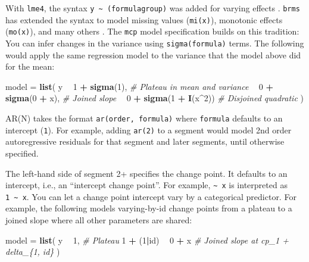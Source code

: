 \documentclass[
  american,
]{article}
\newenvironment{Shaded}{\begin{snugshade}}{\end{snugshade}}
\newcommand{\CommentTok}[1]{\textcolor[rgb]{0.56,0.35,0.01}{\textit{#1}}}
\newcommand{\DecValTok}[1]{\textcolor[rgb]{0.00,0.00,0.81}{#1}}
\newcommand{\KeywordTok}[1]{\textcolor[rgb]{0.13,0.29,0.53}{\textbf{#1}}}
\newcommand{\NormalTok}[1]{#1}
\newcommand{\OperatorTok}[1]{\textcolor[rgb]{0.81,0.36,0.00}{\textbf{#1}}}
\newcommand{\StringTok}[1]{\textcolor[rgb]{0.31,0.60,0.02}{#1}}
\begin{document}
With \texttt{lme4}, the syntax \texttt{y\ \textasciitilde{}\ (formula\textbar{}group)} was added for varying effects \citep{bates2015}. \texttt{brms} has extended the syntax to model missing values (\texttt{mi(x)}), monotonic effects (\texttt{mo(x)}), and many others \citep{burkner2017}. The \texttt{mcp} model specification builds on this tradition: You can infer changes in the variance using \texttt{sigma(formula)} terms. The following would apply the same regression model to the variance that the model above did for the mean:

\begin{Shaded}
\begin{Highlighting}[]
\NormalTok{model =}\StringTok{ }\KeywordTok{list}\NormalTok{(}
\NormalTok{  y }\OperatorTok{~}\StringTok{ }\DecValTok{1} \OperatorTok{+}\StringTok{ }\KeywordTok{sigma}\NormalTok{(}\DecValTok{1}\NormalTok{),         }\CommentTok{# Plateau in mean and variance}
    \OperatorTok{~}\StringTok{ }\DecValTok{0} \OperatorTok{+}\StringTok{ }\KeywordTok{sigma}\NormalTok{(}\DecValTok{0} \OperatorTok{+}\StringTok{ }\NormalTok{x),     }\CommentTok{# Joined slope}
    \OperatorTok{~}\StringTok{ }\DecValTok{0} \OperatorTok{+}\StringTok{ }\KeywordTok{sigma}\NormalTok{(}\DecValTok{1} \OperatorTok{+}\StringTok{ }\KeywordTok{I}\NormalTok{(x}\OperatorTok{^}\DecValTok{2}\NormalTok{)) }\CommentTok{# Disjoined quadratic}
\NormalTok{)}
\end{Highlighting}
\end{Shaded}

AR(N) takes the format \texttt{ar(order,\ formula)} where \texttt{formula} defaults to an intercept (\texttt{1}). For example, adding \texttt{ar(2)} to a segment would model 2nd order autoregressive residuals for that segment and later segments, until otherwise specified.

The left-hand side of segment 2+ specifies the change point. It defaults to an intercept, i.e., an ``intercept change point''. For example, \texttt{\textasciitilde{}\ x} is interpreted as \texttt{1\ \textasciitilde{}\ x}. You can let a change point intercept vary by a categorical predictor. For example, the following models varying-by-id change points from a plateau to a joined slope where all other parameters are shared:

\begin{Shaded}
\begin{Highlighting}[]
\NormalTok{model =}\StringTok{ }\KeywordTok{list}\NormalTok{(}
\NormalTok{  y }\OperatorTok{~}\StringTok{ }\DecValTok{1}\NormalTok{,              }\CommentTok{# Plateau}
  \DecValTok{1} \OperatorTok{+}\StringTok{ }\NormalTok{(}\DecValTok{1}\OperatorTok{|}\NormalTok{id) }\OperatorTok{~}\StringTok{ }\DecValTok{0} \OperatorTok{+}\StringTok{ }\NormalTok{x  }\CommentTok{# Joined slope at cp_1 + delta_\{1, id\}}
\NormalTok{)}
\end{Highlighting}
\end{Shaded}
\end{document}
